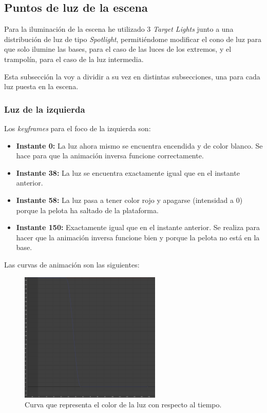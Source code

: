 \documentclass{article}
\begin{document}
\subsection{Puntos de luz de la escena}
Para la iluminación de la escena he utilizado 3 \textit{Target Lights} junto a una distribución de luz de tipo \textit{Spotlight}, permitiéndome modificar el cono de luz para que solo ilumine las bases, para el caso de las luces de los extremos, y el trampolín, para el caso de la luz intermedia.

\bigskip

Esta subsección la voy a dividir a su vez en distintas subsecciones, una para cada luz puesta en la escena.

\subsubsection{Luz de la izquierda}

Los \textit{keyframes} para el foco de la izquierda son:

\begin{itemize}
    \item \textbf{Instante 0: }La luz ahora mismo se encuentra encendida y de color blanco. Se hace para que la animación inversa funcione correctamente.
    \item \textbf{Instante 38: }La luz se encuentra exactamente igual que en el instante anterior.
    \item \textbf{Instante 58: }La luz pasa a tener color rojo y apagarse (intensidad a 0) porque la pelota ha saltado de la plataforma.
    \item \textbf{Instante 150: }Exactamente igual que en el instante anterior. Se realiza para hacer que la animación inversa funcione bien y porque la pelota no está en la base.
\end{itemize}

\bigskip

Las curvas de animación son las siguientes:

\begin{figure}[H]
    \centering
    \includegraphics[width=0.6\textwidth]{imagenes/curvas/LL/filter.png}
    \caption{Curva que representa el color de la luz con respecto al tiempo.}
 \end{figure}
\end{document}
